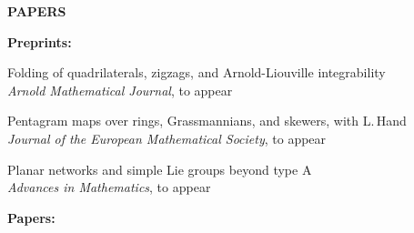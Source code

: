 \documentclass[a4paper, 12pt]{article}
\begin{document}
%
\textbf{PAPERS} \par\smallskip
 \textbf{Preprints:}
 \begin{compactenum}
 
 \item Folding of quadrilaterals, zigzags, and Arnold-Liouville integrability\\  	\textit{Arnold Mathematical Journal}, to appear 
   \item 	Pentagram maps over rings, Grassmannians, and skewers, with L.\,Hand \\ \textit{Journal of the  European Mathematical Society}, to appear
 
 \item 	Planar networks and simple Lie groups beyond type A \\ \textit{Advances in Mathematics}, to appear
 





\end{compactenum}
 \par\smallskip
 \textbf{Papers:}
\end{document}
